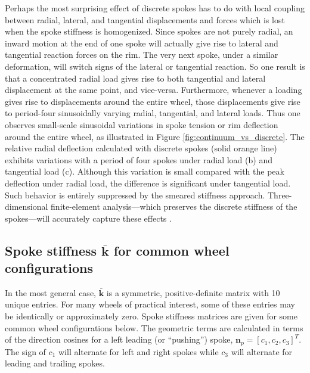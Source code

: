 \documentclass[\rootdir/thesis.tex]{subfiles}
\begin{document}
Perhaps the most surprising effect of discrete spokes has to do with local coupling between radial, lateral, and tangential displacements and forces which is lost when the spoke stiffness is homogenized. Since spokes are not purely radial, an inward motion at the end of one spoke will actually give rise to lateral and tangential reaction forces on the rim. The very next spoke, under a similar deformation, will switch signs of the lateral or tangential reaction. So one result is that a concentrated radial load gives rise to both tangential and lateral displacement at the same point, and vice-versa. Furthermore, whenever a loading gives rise to displacements around the entire wheel, those displacements give rise to period-four sinusoidally varying radial, tangential, and lateral loads. Thus one observes small-scale sinusoidal variations in spoke tension or rim deflection around the entire wheel, as illustrated in Figure \ref{fig:continuum_vs_discrete}. The relative radial deflection calculated with discrete spokes (solid orange line) exhibits variations with a period of four spokes under radial load (b) and tangential load (c). Although this variation is small compared with the peak deflection under radial load, the difference is significant under tangential load. Such behavior is entirely suppressed by the smeared stiffness approach. Three-dimensional finite-element analysis---which preserves the discrete stiffness of the spokes---will accurately capture these effects \cite{Salamon1992}.

\subsection{Spoke stiffness $\bar{\mathbf{k}}$ for common wheel configurations}

In the most general case, $\bar{\mathbf{k}}$ is a symmetric, positive-definite matrix with 10 unique entries. For many wheels of practical interest, some of these entries may be identically or approximately zero. Spoke stiffness matrices are given for some common wheel configurations below. The geometric terms are calculated in terms of the direction cosines for a left leading (or ``pushing'') spoke, $\mathbf{n}_p = [c_1, c_2, c_3]^T$. The sign of $c_1$ will alternate for left and right spokes while $c_3$ will alternate for leading and trailing spokes.
\end{document}
